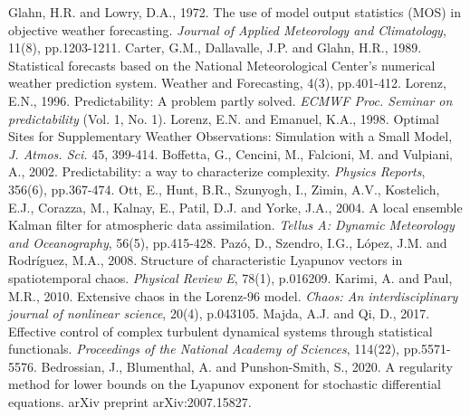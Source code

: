 \documentclass[10pt]{article}
\begin{document}
\begin{thebibliography}{99}

 Glahn, H.R. and Lowry, D.A., 1972. The use of model output statistics (MOS) in objective weather forecasting. {\em Journal of Applied Meteorology and Climatology}, 11(8), pp.1203-1211.
 Carter, G.M., Dallavalle, J.P. and Glahn, H.R., 1989. Statistical forecasts based on the National Meteorological Center's numerical weather prediction system. Weather and Forecasting, 4(3), pp.401-412.
 Lorenz, E.N., 1996. Predictability: A problem partly solved. {\em ECMWF Proc. Seminar on predictability} (Vol. 1, No. 1).
 Lorenz, E.N. and Emanuel, K.A., 1998. Optimal Sites for Supplementary Weather Observations: Simulation with a Small Model, {\em J. Atmos. Sci.} 45, 399-414.
 Boffetta, G., Cencini, M., Falcioni, M. and Vulpiani, A., 2002. Predictability: a way to characterize complexity. {\em Physics Reports}, 356(6), pp.367-474.
 Ott, E., Hunt, B.R., Szunyogh, I., Zimin, A.V., Kostelich, E.J., Corazza, M., Kalnay, E., Patil, D.J. and Yorke, J.A., 2004. A local ensemble Kalman filter for atmospheric data assimilation. {\em Tellus A: Dynamic Meteorology and Oceanography}, 56(5), pp.415-428.
 Paz\'o, D., Szendro, I.G., L\'opez, J.M. and Rodríguez, M.A., 2008. Structure of characteristic Lyapunov vectors in spatiotemporal chaos. {\em Physical Review E}, 78(1), p.016209.
 Karimi, A. and Paul, M.R., 2010. Extensive chaos in the Lorenz-96 model. {\em Chaos: An interdisciplinary journal of nonlinear science}, 20(4), p.043105.
 Majda, A.J. and Qi, D., 2017. Effective control of complex turbulent dynamical systems through statistical functionals. {\em Proceedings of the National Academy of Sciences}, 114(22), pp.5571-5576.
 Bedrossian, J., Blumenthal, A. and Punshon-Smith, S., 2020. A regularity method for lower bounds on the Lyapunov exponent for stochastic differential equations. arXiv preprint arXiv:2007.15827.
\end{thebibliography}
\end{document}
